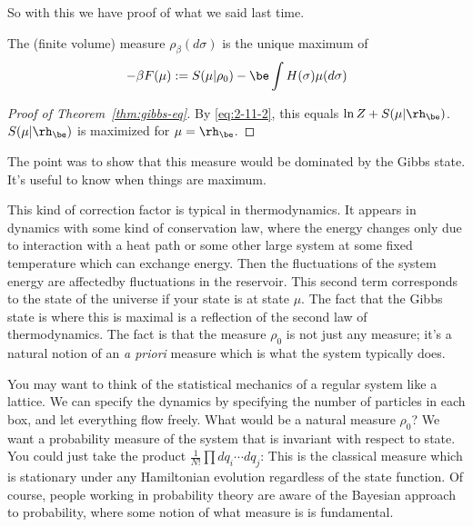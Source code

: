 So with this we have proof of what we said last time.

\begin{thm*}
The (finite volume)  measure $\rho_{\beta}(d\sigma)$ is the unique maximum of 
\[
-\beta F(\mu) := S(\mu|\rho_0) - \be \int H(\sigma) \mu (d\sigma)
\]
\end{thm*}
\begin{proof}[Proof of Theorem~\ref{thm:gibbs-eq}]
By \eqref{eq:2-11-2}, this equals $\ln Z + S(\mu|\rh_\be)$. $S(\mu|\rh_\be)$ is maximized for $\mu=\rh_\be$.
\end{proof}

The point was to show that this measure would be dominated by the Gibbs state. It's useful to know when things are maximum. 

This kind of correction factor is typical in thermodynamics. It appears in dynamics with some kind of conservation law, where the energy changes only due to interaction with a heat path or some other large system at some fixed temperature which can exchange energy. 
Then the fluctuations of the system energy are affectedby fluctuations in the reservoir. This second term corresponds to the state of the universe if your state is at state $\mu$. The fact that the Gibbs state is where this is maximal is a reflection of the second law of thermodynamics. The fact is that the measure $\rho_0$ is not just any measure; it's a natural notion of an \textit{a priori} measure which is what the system typically does. 

You may want to think of the statistical mechanics of a regular system like a lattice. We can specify the dynamics by specifying the number of particles in each box, and let everything flow freely. What would be a natural measure $\rho_0$? We want a probability measure of the system that is invariant with respect to state. You could just take the product $\frac{1}{N!}\prod dq_i \cdots dq_j$: This is the classical measure which is stationary under any Hamiltonian evolution regardless of the state function. Of course, people working in probability theory are aware of the Bayesian approach to probability, where some notion of what  measure is is fundamental. 


